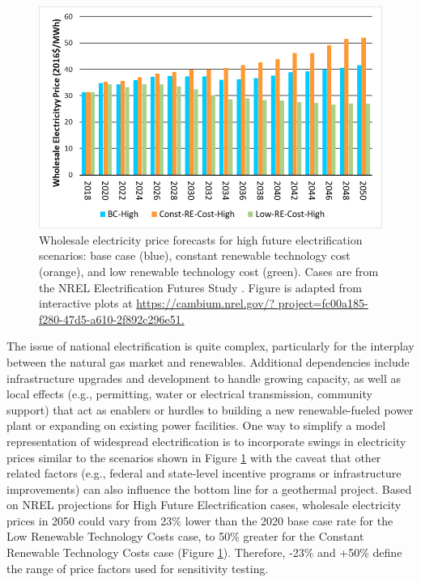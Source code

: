 \begin{figure}
\centering
\includegraphics[scale=0.65]{templates/images/Figure-EFS_SIPA_Results.png}
\singlespacing
\caption[Electrification price impact]{Wholesale electricity price forecasts for high future electrification scenarios: base case (blue), constant renewable technology cost (orange), and low renewable technology cost (green). Cases are from the NREL Electrification Futures Study \protect\citep{murphy_electrification_2021}. Figure is adapted from interactive plots at \url{https://cambium.nrel.gov/? project=fc00a185-f280-47d5-a610-2f892c296e51.}}
\label{fig:EFS_electricification}
\end{figure}
The issue of national electrification is quite complex, particularly for the interplay between the natural gas market and renewables. Additional dependencies include infrastructure upgrades and development to handle growing capacity, as well as local effects (e.g., permitting, water or electrical transmission, community support) that act as enablers or hurdles to building a new renewable-fueled power plant or expanding on existing power facilities. One way to simplify a model representation of widespread electrification is to incorporate swings in electricity prices similar to the scenarios shown in Figure \ref{fig:EFS_electricification} with the caveat that other related factors (e.g., federal and state-level incentive programs or infrastructure improvements) can also influence the bottom line for a geothermal project. Based on NREL projections for High Future Electrification cases, wholesale electricity prices in 2050 could vary from 23\% lower than the 2020 base case rate for the Low Renewable Technology Costs case, to 50\% greater for the Constant Renewable Technology Costs case (Figure \ref{fig:EFS_electricification}). Therefore, -23\% and +50\% define the range of price factors used for sensitivity testing.
\\
\\
